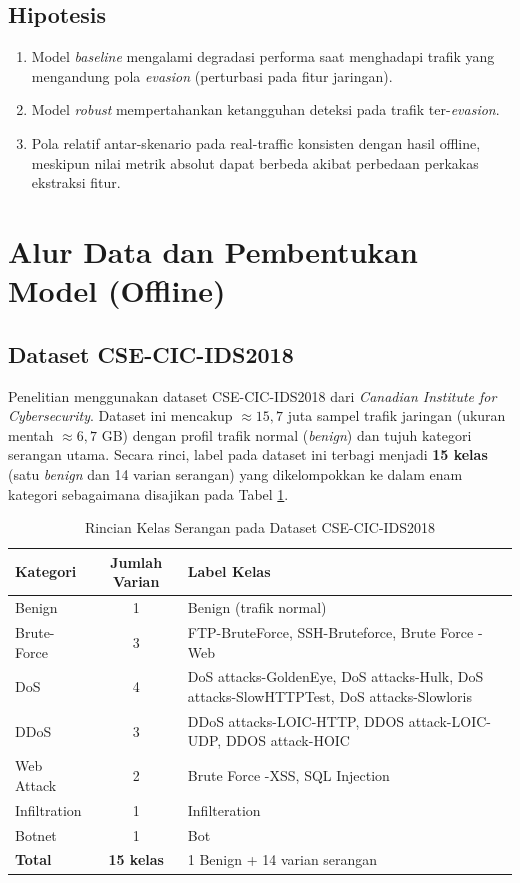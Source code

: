 \documentclass[11pt, a4paper]{article}
\begin{document}
\subsection{Hipotesis}
\begin{enumerate}[leftmargin=1.4cm]
    \item Model \textit{baseline} mengalami degradasi performa saat menghadapi trafik yang mengandung pola \textit{evasion} (perturbasi pada fitur jaringan).
    \item Model \textit{robust} mempertahankan ketangguhan deteksi pada trafik ter-\textit{evasion}.
    \item Pola relatif antar-skenario pada real-traffic konsisten dengan hasil offline, meskipun nilai metrik absolut dapat berbeda akibat perbedaan perkakas ekstraksi fitur.
\end{enumerate}

\section{Alur Data dan Pembentukan Model (Offline)}

\subsection{Dataset CSE-CIC-IDS2018}
Penelitian menggunakan dataset CSE-CIC-IDS2018 dari \textit{Canadian Institute for Cybersecurity}. Dataset ini mencakup $\approx 15{,}7$ juta sampel trafik jaringan (ukuran mentah $\approx 6{,}7$ GB) dengan profil trafik normal (\textit{benign}) dan tujuh kategori serangan utama. Secara rinci, label pada dataset ini terbagi menjadi \textbf{15 kelas} (satu \textit{benign} dan 14 varian serangan) yang dikelompokkan ke dalam enam kategori sebagaimana disajikan pada Tabel \ref{tab:dataset_class}.

\begin{table}[htbp]
\centering
\caption{Rincian Kelas Serangan pada Dataset CSE-CIC-IDS2018}
\label{tab:dataset_class}
\small
\begin{tabularx}{\linewidth}{@{} l c X @{}}
\toprule
\textbf{Kategori} & \textbf{Jumlah Varian} & \textbf{Label Kelas} \\ \midrule
Benign & 1 & Benign (trafik normal) \\ \addlinespace
Brute-Force & 3 & FTP-BruteForce, SSH-Bruteforce, Brute Force -Web \\ \addlinespace
DoS & 4 & DoS attacks-GoldenEye, DoS attacks-Hulk, DoS attacks-SlowHTTPTest, DoS attacks-Slowloris \\ \addlinespace
DDoS & 3 & DDoS attacks-LOIC-HTTP, DDOS attack-LOIC-UDP, DDOS attack-HOIC \\ \addlinespace
Web Attack & 2 & Brute Force -XSS, SQL Injection \\ \addlinespace
Infiltration & 1 & Infilteration \\ \addlinespace
Botnet & 1 & Bot \\ \midrule
\textbf{Total} & \textbf{15 kelas} & 1 Benign + 14 varian serangan \\ \bottomrule
\end{tabularx}
\end{table}
\end{document}
